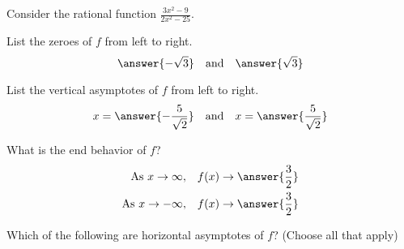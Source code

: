 \documentclass{ximera}
\author{Bobby Ramsey}
\begin{document}
Consider the rational function $\displaystyle \frac{3x^2-9}{2x^2-25}$.

\begin{exercise}
	List the zeroes of $f$ from left to right.
	\[ \answer{-\sqrt{3}} \quad \text{and} \quad \answer{\sqrt{3}} \]
\end{exercise}

\begin{exercise}
	List the vertical asymptotes of $f$ from left to right.	
	\[ x = \answer{-\frac{5}{\sqrt{2}}} \quad \text{and} \quad x=\answer{\frac{5}{\sqrt{2}}} \]
\end{exercise}	
	
\begin{exercise}
	What is the end behavior of $f$?
	\begin{align*}
		\text{As} \,\, x \to \infty, &\quad f(x) \to \answer{\frac{3}{2}}\\
		\text{As} \,\, x \to -\infty, &\quad f(x) \to \answer{\frac{3}{2}}\\
	\end{align*}	
\end{exercise}	
	
\begin{exercise}
	Which of the following are horizontal asymptotes of $f$? (Choose all that apply)
	\begin{selectAll}
	\end{selectAll}	
\end{exercise}	
	
\end{document}
